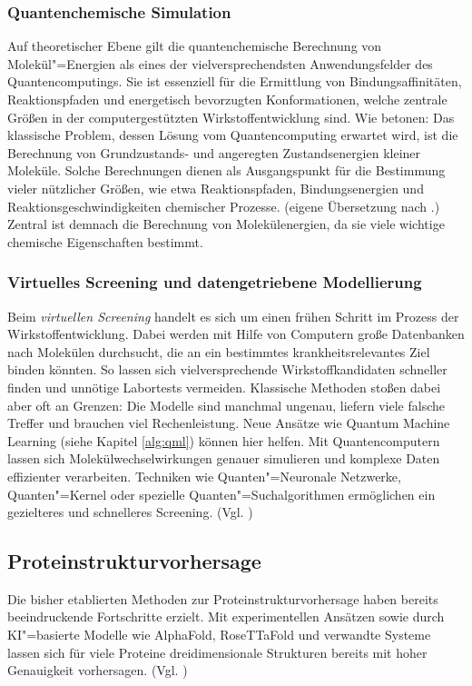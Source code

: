 \subsubsection*{Quantenchemische Simulation}
Auf theoretischer Ebene gilt die quantenchemische Berechnung von Molekül"=Energien als eines der vielversprechendsten Anwendungsfelder des Quantencomputings. Sie ist essenziell für die Ermittlung von Bindungsaffinitäten, Reaktionspfaden und energetisch bevorzugten Konformationen, welche zentrale Größen in der computergestützten Wirkstoffentwicklung sind. Wie \cite{cao_quantum_2019} betonen: Das klassische Problem, dessen Lösung vom Quantencomputing erwartet wird, ist die Berechnung von Grundzustands- und angeregten Zustandsenergien kleiner Moleküle. Solche Berechnungen dienen als Ausgangspunkt für die Bestimmung vieler nützlicher Größen, wie etwa Reaktionspfaden, Bindungsenergien und Reaktionsgeschwindigkeiten chemischer Prozesse. (eigene Übersetzung nach \cite{cao_quantum_2019}.) Zentral ist demnach die Berechnung von Molekülenergien, da sie viele wichtige chemische Eigenschaften bestimmt.

\subsubsection*{Virtuelles Screening und datengetriebene Modellierung}
Beim \textit{virtuellen Screening} handelt es sich um einen frühen Schritt im Prozess der Wirkstoffentwicklung. Dabei werden mit Hilfe von Computern große Datenbanken nach Molekülen durchsucht, die an ein bestimmtes krankheitsrelevantes Ziel binden könnten. So lassen sich vielversprechende Wirkstoffkandidaten schneller finden und unnötige Labortests vermeiden. Klassische Methoden stoßen dabei aber oft an Grenzen: Die Modelle sind manchmal ungenau, liefern viele falsche Treffer und brauchen viel Rechenleistung. Neue Ansätze wie Quantum Machine Learning (siehe Kapitel \ref{alg:qml}) können hier helfen. Mit Quantencomputern lassen sich Molekülwechselwirkungen genauer simulieren und komplexe Daten effizienter verarbeiten. Techniken wie Quanten"=Neuronale Netzwerke, Quanten"=Kernel oder spezielle Quanten"=Suchalgorithmen ermöglichen ein gezielteres und schnelleres Screening. (Vgl. \cite{kumar2024})


\subsection{Proteinstrukturvorhersage}
\label{med:protein}
Die bisher etablierten Methoden zur Proteinstrukturvorhersage haben bereits beeindruckende Fortschritte erzielt. Mit experimentellen Ansätzen sowie durch KI"=basierte Modelle wie AlphaFold, RoseTTaFold und verwandte Systeme lassen sich für viele Proteine dreidimensionale Strukturen bereits mit hoher Genauigkeit vorhersagen. (Vgl. \cite{jumper2021, baek2021})

